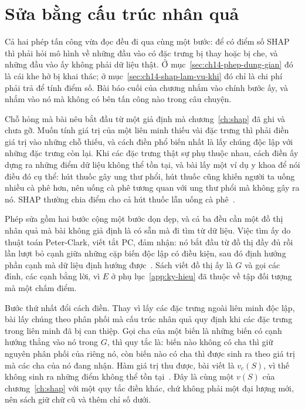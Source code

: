 \section{Sửa bằng cấu trúc nhân quả}
\label{sec:ch14-sua-bang-nhan-qua}

%
Cả hai phép tấn công vừa đọc đều đi qua cùng một bước: để có điểm số SHAP thì
phải hỏi mô hình về những đầu vào có đặc trưng bị thay hoặc bị che, và những
đầu vào ấy không phải dữ liệu thật. Ở mục~\ref{sec:ch14-phep-dung-gian} đó là
cái khe hở bị khai thác; ở mục~\ref{sec:ch14-shap-lam-vu-khi} đó chỉ là chi phí
phải trả để tính điểm số. Bài báo cuối của chương nhắm vào chính bước ấy, và
nhắm vào nó mà không có bên tấn công nào trong câu chuyện.

%
Chỗ hỏng mà bài nêu bắt đầu từ một giả định mà chương~\ref{ch:shap} đã ghi và
chưa gỡ. Muốn tính giá trị của một liên minh thiếu vài đặc trưng thì phải điền
giá trị vào những chỗ thiếu, và cách điền phổ biến nhất là lấy chúng độc lập
với những đặc trưng còn lại. Khi các đặc trưng thật sự phụ thuộc nhau, cách
điền ấy dựng ra những điểm dữ liệu không thể tồn tại, và bài lấy một ví dụ y
khoa để nói điều đó cụ thể: hút thuốc gây ung thư phổi, hút thuốc cũng khiến
người ta uống nhiều cà phê hơn, nên uống cà phê tương quan với ung thư phổi mà
không gây ra nó. SHAP thường chia điểm cho cả hút thuốc lẫn uống cà
phê~\autocite{p29causalshap}.

%
Phép sửa gồm hai bước cộng một bước dọn dẹp, và cả ba đều cần một đồ thị nhân
quả mà bài không giả định là có sẵn mà đi tìm từ dữ liệu. Việc tìm ấy do thuật
toán Peter-Clark, viết tắt PC, đảm nhận: nó bắt đầu từ đồ thị đầy đủ rồi lần
lượt bỏ cạnh giữa những cặp biến độc lập có điều kiện, sau đó định hướng phần
cạnh mà dữ liệu định hướng được~\autocite{p29causalshap}. Sách viết đồ thị ấy
là $G$ và gọi các đỉnh, các cạnh bằng lời, vì $E$ ở phụ lục~\ref{app:ky-hieu}
đã thuộc về tập đối tượng mà một 
chấm điểm.

Bước thứ nhất đổi cách điền. Thay vì lấy các đặc trưng ngoài liên minh độc lập,
bài lấy chúng theo phân phối mà cấu trúc nhân quả quy định khi các đặc trưng
trong liên minh đã bị can thiệp. Gọi cha của một biến là những biến có cạnh
hướng thẳng vào nó trong $G$, thì quy tắc là: biến nào không có cha thì giữ
nguyên phân phối của riêng nó, còn biến nào có cha thì được sinh ra theo giá
trị mà các cha của nó đang nhận. Hàm giá trị thu được, bài viết là $v_c(S)$, vì
thế không sinh ra những điểm không thể tồn tại~\autocite{p29causalshap}. Đây là
cùng một $v(S)$ của chương~\ref{ch:shap} với một quy tắc điền khác, chứ không
phải một đại lượng mới, nên sách giữ chữ cũ và thêm chỉ số dưới.


